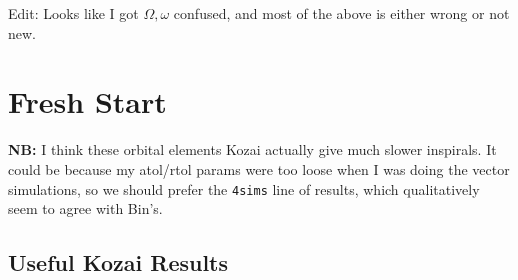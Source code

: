 \documentclass[11pt,
        usenames, %
        dvipsnames %
    ]{article}
\begin{document}
Edit: Looks like I got $\Omega, \omega$ confused, and most of the above is
either wrong or not new.

\section{Fresh Start}

\textbf{NB:} I think these orbital elements Kozai actually give much slower
inspirals. It could be because my atol/rtol params were too loose when I was
doing the vector simulations, so we should prefer the \lstinline{4sims} line of
results, which qualitatively seem to agree with Bin's.

\subsection{Useful Kozai Results}
\end{document}
